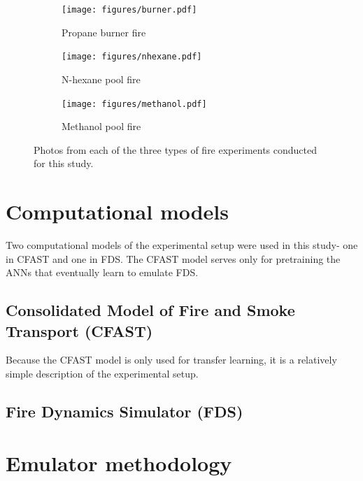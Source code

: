 \documentclass{article}
\begin{document}
\begin{figure}[htbp]
  \centering
  \begin{subfigure}[t]{.301\textwidth}
      \centering
      \texttt{[image: figures/burner.pdf]}
      \caption{Propane burner fire}
      \label{fig:fire_image}
  \end{subfigure}
  \begin{subfigure}[t]{.3\textwidth}
      \centering
      \texttt{[image: figures/nhexane.pdf]}
      \caption{N-hexane pool fire}
      \label{fig:brightness_heatmap}
  \end{subfigure}
  \begin{subfigure}[t]{.3\textwidth}
      \centering
      \texttt{[image: figures/methanol.pdf]}
      \caption{Methanol pool fire}
      \label{fig:binary_fire_image}
  \end{subfigure}
  \caption{Photos from each of the three types of fire experiments conducted for this study.}
\end{figure}


\section{Computational models}
Two computational models of the experimental setup were used in this study- one in CFAST and one in FDS. The CFAST model serves only for pretraining the ANNs that eventually learn to emulate FDS. 
\subsection{Consolidated Model of Fire and Smoke Transport (CFAST)}
Because the CFAST model is only used for transfer learning, it is a relatively simple description of the experimental setup. 


\subsection{Fire Dynamics Simulator (FDS)}




\section{Emulator methodology}
\end{document}
